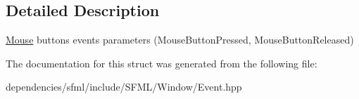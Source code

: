 \subsection{Detailed Description}
\hyperlink{classsf_1_1_mouse}{Mouse} buttons events parameters (Mouse\+Button\+Pressed, Mouse\+Button\+Released) 

The documentation for this struct was generated from the following file\+:\begin{DoxyCompactItemize}
\item 
dependencies/sfml/include/\+S\+F\+M\+L/\+Window/Event.\+hpp\end{DoxyCompactItemize}
